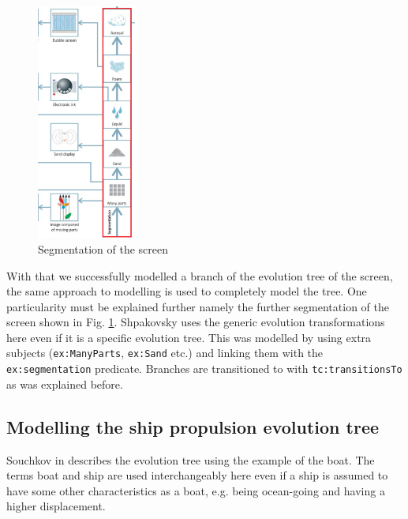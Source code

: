 \documentclass[11pt,a4paper]{article}
\begin{document}
\begin{figure}
  \begin{center}\vspace*{-2em}
    \includegraphics[width=0.3\textwidth]{figures/segmentation.png}
  \end{center}
  \caption{\small Segmentation of the screen \cite{Shpakovsky2016}}
  \label{fig:segmentation}
\end{figure}

With that we successfully modelled a branch of the evolution tree of the
screen, the same approach to modelling is used to completely model the tree.
One particularity must be explained further namely the further segmentation of
the screen shown in Fig. \ref{fig:segmentation}. Shpakovsky uses the generic
evolution transformations here even if it is a specific evolution tree. This
was modelled by using extra subjects (\texttt{ex:ManyParts}, \texttt{ex:Sand}
etc.) and linking them with the \texttt{ex:segmentation} predicate. Branches
are transitioned to with \texttt{tc:transitionsTo} as was explained before.


\subsection{Modelling the ship propulsion evolution tree}

Souchkov in \cite{KS} describes the evolution tree using the example of the
boat. The terms boat and ship are used interchangeably here even if a ship is
assumed to have some other characteristics as a boat, e.g. being ocean-going
and having a higher displacement. 
\end{document}

